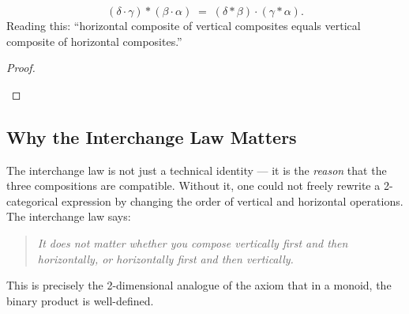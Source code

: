 \begin{theorem}
\[
  (\delta \cdot \gamma) * (\beta \cdot \alpha)
  \;=\; (\delta * \beta) \cdot (\gamma * \alpha).
\]
Reading this: ``horizontal composite of vertical composites equals
vertical composite of horizontal composites.''
\end{theorem}

\begin{proof}
\begin{prooflog}
\end{prooflog}
\end{proof}

\subsection{Why the Interchange Law Matters}

The interchange law is not just a technical identity --- it is the
\emph{reason} that the three compositions are compatible. Without it, one
could not freely rewrite a 2-categorical expression by changing the order
of vertical and horizontal operations. The interchange law says:
\begin{quote}
\emph{It does not matter whether you compose vertically first and then
horizontally, or horizontally first and then vertically.}
\end{quote}
This is precisely the 2-dimensional analogue of the axiom that in a
monoid, the binary product is well-defined.

